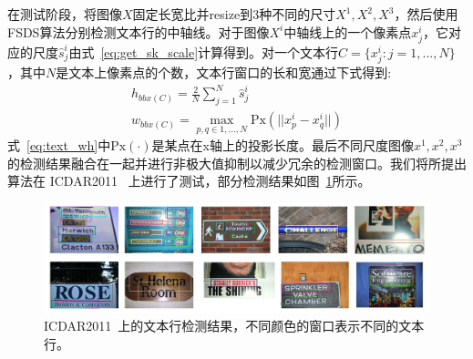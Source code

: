 \documentclass[UTF8]{ctexart}
\numberwithin{equation}{section} %
\numberwithin{table}{section} %
\begin{document}
在测试阶段，将图像$X$固定长宽比并resize到3种不同的尺寸$X^1,X^2,X^3$，然后使用FSDS算法分别检测文本行的中轴线。对于图像$X^i$中轴线上的一个像素点$x^i_j$，它对应的尺度$\hat{s}^i_j$由式~\ref{eq:get_sk_scale}计算得到。对一个文本行$C=\big\{x^i_j:j=1,...,N\big\}$，其中$N$是文本上像素点的个数，文本行窗口的长和宽通过下式得到:
\begin{equation}
\begin{split}
h_{bbx(C)} = \frac{2}{N}\sum_{j=1}^N\hat{s}^i_j \\
w_{bbx(C)} = \max_{p,q\in{1,...,N}}\text{Px}(||x^i_p - x^i_q||)
\end{split}
\label{eq:text_wh}
\end{equation}
式~\ref{eq:text_wh}中$\text{Px}(\cdot)$是某点在x轴上的投影长度。最后不同尺度图像${x^1,x^2,x^3}$的检测结果融合在一起并进行非极大值抑制以减少冗余的检测窗口。我们将所提出算法在 ICDAR2011 ~\cite{shahab2011icdar}上进行了测试，部分检测结果如图~\ref{fig:text_prop}所示。
\begin{figure}[H]
\centering
\includegraphics[scale=0.38]{figures/text_lines_proposals}
\caption{ICDAR2011~\cite{shahab2011icdar}上的文本行检测结果，不同颜色的窗口表示不同的文本行。}
\label{fig:text_prop}
\end{figure}
\end{document}
